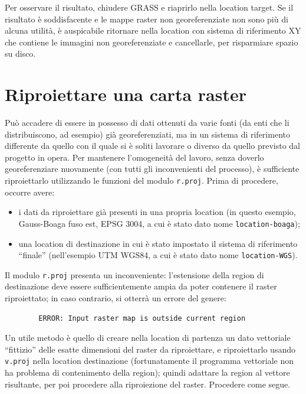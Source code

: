 		Per osservare il risultato, chiudere GRASS e riaprirlo nella location target. Se il risultato è soddisfacente e le mappe raster non georeferenziate non sono più di alcuna utilità, è auspicabile ritornare nella location con sistema di riferimento XY che contiene le immagini non georeferenziate e cancellarle, per risparmiare spazio su disco.


\section{Riproiettare una carta raster\label{sec:Riproiettare-raster}}
	Può accadere di essere in possesso di dati ottenuti da varie fonti (da enti che li distribuiscono, ad esempio) già georeferenziati, ma in un sistema di riferimento differente da quello con il quale si è soliti lavorare o diverso da quello previsto dal progetto in opera.  Per mantenere l'omogeneità del lavoro, senza doverlo georeferenziare nuovamente (con tutti gli inconvenienti del processo), è sufficiente riproiettarlo utilizzando le funzioni del modulo \texttt{r.proj}.  Prima di procedere, occorre avere:
	
	\begin{itemize}
		\item i dati da riproiettare già presenti in una propria location (in questo esempio, Gauss-Boaga fuso est, EPSG 3004, a cui è stato dato nome \texttt{location-boaga});
		\item una location di destinazione in cui è stato impostato il sistema di riferimento ``finale'' (nell'esempio UTM WGS84, a cui è stato dato nome \texttt{location-WGS}).
	\end{itemize}
	
	Il modulo \texttt{r.proj} presenta un inconveniente: l'estensione della region di destinazione deve essere sufficientemente ampia da poter contenere il raster riproiettato; in caso contrario, si otterrà un errore del genere:
	
	\begin{verbatim}
		ERROR: Input raster map is outside current region
	\end{verbatim}
	
	Un utile metodo è quello di creare nella location di partenza un dato vettoriale ``fittizio'' delle esatte dimensioni del raster da riproiettare, e riproiettarlo usando \texttt{v.proj} nella location destinazione (fortunatamente il programma vettoriale non ha problema di contenimento della region); quindi adattare la region al vettore risultante, per poi procedere alla riproiezione del raster. Procedere come segue.
	
